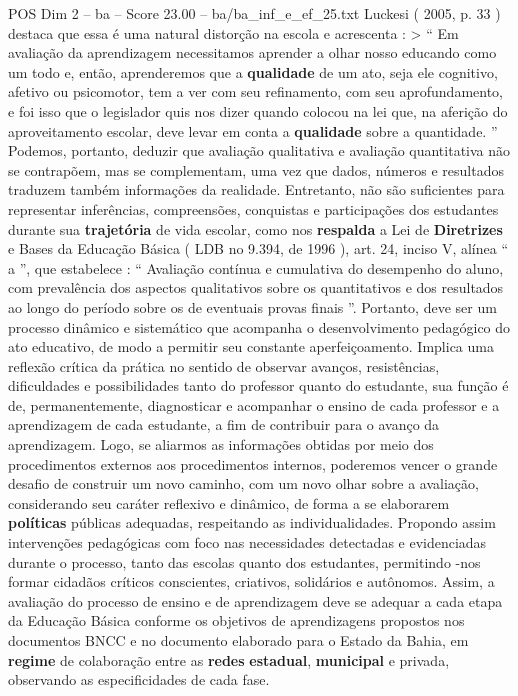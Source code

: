 \begin{textsample}{POS Dim 2 – ba – Score 23.00 – ba/ba\_inf\_e\_ef\_25.txt}
Luckesi ( 2005, p. 33 ) destaca que essa é uma natural distorção na escola e acrescenta : > “ Em avaliação da aprendizagem necessitamos aprender a olhar nosso educando como um todo e, então, aprenderemos que a \textbf{qualidade} de um ato, seja ele cognitivo, afetivo ou psicomotor, tem a ver com seu refinamento, com seu aprofundamento, e foi isso que o legislador quis nos dizer quando colocou na lei que, na aferição do aproveitamento escolar, deve levar em conta a \textbf{qualidade} sobre a quantidade. ” Podemos, portanto, deduzir que avaliação qualitativa e avaliação quantitativa não se contrapõem, mas se complementam, uma vez que dados, números e resultados traduzem também informações da realidade.
Entretanto, não são suficientes para representar inferências, compreensões, conquistas e participações dos estudantes durante sua \textbf{trajetória} de vida escolar, como nos \textbf{respalda} a Lei de \textbf{Diretrizes} e Bases da Educação Básica ( LDB no 9.394, de 1996 ), art. 24, inciso V, alínea “ a ”, que estabelece : “ Avaliação contínua e cumulativa do desempenho do aluno, com prevalência dos aspectos qualitativos sobre os quantitativos e dos resultados ao longo do período sobre os de eventuais provas finais ”.
Portanto, deve ser um processo dinâmico e sistemático que acompanha o desenvolvimento pedagógico do ato educativo, de modo a permitir seu constante aperfeiçoamento.
Implica uma reflexão crítica da prática no sentido de observar avanços, resistências, dificuldades e possibilidades tanto do professor quanto do estudante, sua função é de, permanentemente, diagnosticar e acompanhar o ensino de cada professor e a aprendizagem de cada estudante, a fim de contribuir para o avanço da aprendizagem.
Logo, se aliarmos as informações obtidas por meio dos procedimentos externos aos procedimentos internos, poderemos vencer o grande desafio de construir um novo caminho, com um novo olhar sobre a avaliação, considerando seu caráter reflexivo e dinâmico, de forma a se elaborarem \textbf{políticas} públicas adequadas, respeitando as individualidades.
Propondo assim intervenções pedagógicas com foco nas necessidades detectadas e evidenciadas durante o processo, tanto das escolas quanto dos estudantes, permitindo -nos formar cidadãos críticos conscientes, criativos, solidários e autônomos.
Assim, a avaliação do processo de ensino e de aprendizagem deve se adequar a cada etapa da Educação Básica conforme os objetivos de aprendizagens propostos nos documentos BNCC e no documento elaborado para o Estado da Bahia, em \textbf{regime} de colaboração entre as \textbf{redes} \textbf{estadual}, \textbf{municipal} e privada, observando as especificidades de cada fase.

\end{textsample}
